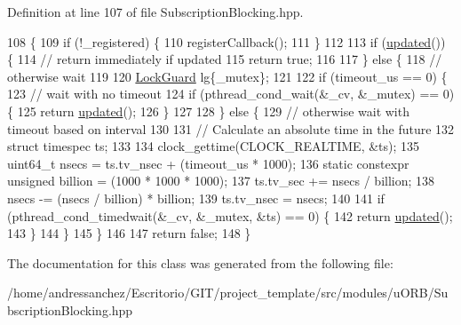 Definition at line 107 of file Subscription\+Blocking.\+hpp.


\begin{DoxyCode}
108     \{
109         \textcolor{keywordflow}{if} (!\_registered) \{
110             registerCallback();
111         \}
112 
113         \textcolor{keywordflow}{if} (\hyperlink{classuORB_1_1SubscriptionInterval_aa1c12b83d65604e306b919a2c224e32e}{updated}()) \{
114             \textcolor{comment}{// return immediately if updated}
115             \textcolor{keywordflow}{return} \textcolor{keyword}{true};
116 
117         \} \textcolor{keywordflow}{else} \{
118             \textcolor{comment}{// otherwise wait}
119 
120             \hyperlink{classLockGuard}{LockGuard} lg\{\_mutex\};
121 
122             \textcolor{keywordflow}{if} (timeout\_us == 0) \{
123                 \textcolor{comment}{// wait with no timeout}
124                 \textcolor{keywordflow}{if} (pthread\_cond\_wait(&\_cv, &\_mutex) == 0) \{
125                     \textcolor{keywordflow}{return} \hyperlink{classuORB_1_1SubscriptionInterval_aa1c12b83d65604e306b919a2c224e32e}{updated}();
126                 \}
127 
128             \} \textcolor{keywordflow}{else} \{
129                 \textcolor{comment}{// otherwise wait with timeout based on interval}
130 
131                 \textcolor{comment}{// Calculate an absolute time in the future}
132                 \textcolor{keyword}{struct }timespec ts;
133                 
134                 clock\_gettime(CLOCK\_REALTIME, &ts);
135                 uint64\_t nsecs = ts.tv\_nsec + (timeout\_us * 1000);
136                 \textcolor{keyword}{static} constexpr \textcolor{keywordtype}{unsigned} billion = (1000 * 1000 * 1000);
137                 ts.tv\_sec += nsecs / billion;
138                 nsecs -= (nsecs / billion) * billion;
139                 ts.tv\_nsec = nsecs;
140 
141                 \textcolor{keywordflow}{if} (pthread\_cond\_timedwait(&\_cv, &\_mutex, &ts) == 0) \{
142                     \textcolor{keywordflow}{return} \hyperlink{classuORB_1_1SubscriptionInterval_aa1c12b83d65604e306b919a2c224e32e}{updated}();
143                 \}
144             \}
145         \}
146 
147         \textcolor{keywordflow}{return} \textcolor{keyword}{false};
148     \}
\end{DoxyCode}


The documentation for this class was generated from the following file\+:\begin{DoxyCompactItemize}
\item 
/home/andressanchez/\+Escritorio/\+G\+I\+T/project\+\_\+template/src/modules/u\+O\+R\+B/Subscription\+Blocking.\+hpp\end{DoxyCompactItemize}
